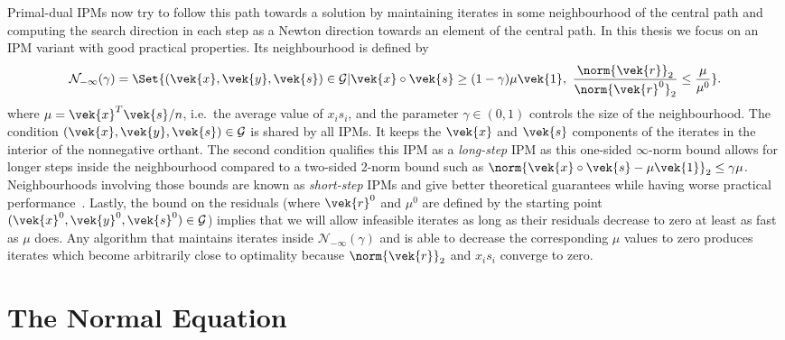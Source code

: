 Primal-dual IPMs now try to follow this path towards a solution by maintaining iterates in some neighbourhood of the central path and computing the search direction in each step as a Newton direction towards an element of the central path.
In this thesis we focus on an IPM variant with good practical properties.
Its neighbourhood is defined by
\begin{equation}
  \mathcal{N}_{-\infty}(\gamma) = \Set{ (\vek{x}, \vek{y}, \vek{s}) \in \mathcal{G} | \vek{x} \circ \vek{s} \geq (1 - \gamma) \mu \vek{1}, \ \frac{\norm{\vek{r}}_2}{\norm{\vek{r}^0}_2} \leq \frac{\mu}{\mu^0} }. \label{eqn:neighbourhood}
\end{equation}
where \(\mu = \vek{x}^T \vek{s}/n\), i.e.\ the average value of \(x_i s_i\), and the parameter \(\gamma \in (0, 1)\) controls the size of the neighbourhood.
The condition \((\vek{x}, \vek{y}, \vek{s}) \in \mathcal{G}\) is shared by all IPMs.
It keeps the \(\vek{x}\) and \(\vek{s}\) components of the iterates in the interior of the nonnegative orthant.
The second condition qualifies this IPM as a \emph{long-step} IPM as this one-sided \(\infty\)-norm bound allows for longer steps inside the neighbourhood compared to a two-sided 2-norm bound such as \(\norm{\vek{x} \circ \vek{s} - \mu \vek{1}}_2 \leq \gamma \mu\).
Neighbourhoods involving those bounds are known as \emph{short-step} IPMs and give better theoretical guarantees while having worse practical performance~\cite[Chapter 5]{Wright-PrimalDualInteriorPointMethods}.
Lastly, the bound on the residuals (where \(\vek{r}^0\) and \(\mu^0\) are defined by the starting point \((\vek{x}^0, \vek{y}^0, \vek{s}^0) \in \mathcal{G}\)) implies that we will allow infeasible iterates as long as their residuals decrease to zero at least as fast as \(\mu\) does.
Any algorithm that maintains iterates inside \(\mathcal{N}_{-\infty}(\gamma)\) and is able to decrease the corresponding \(\mu\) values to zero produces iterates which become arbitrarily close to optimality because \(\norm{\vek{r}}_2\) and \(x_i s_i\) converge to zero.

\section{The Normal Equation}\label{sec:ipm-search-direction}

